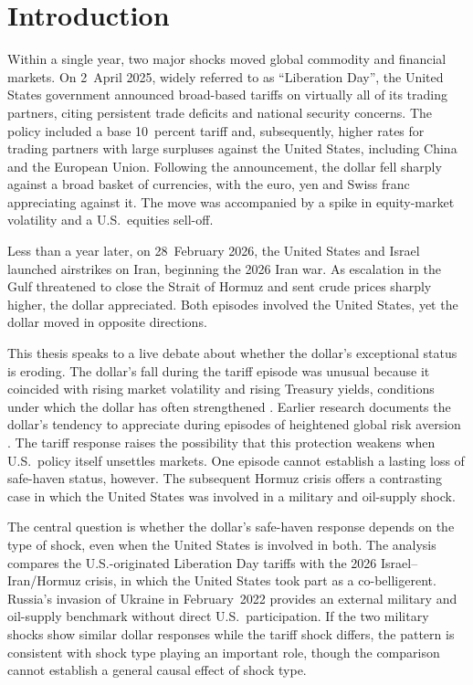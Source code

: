 
\chapter{Introduction}
\label{ch:introduction}

Within a single year, two major shocks moved global commodity and financial markets. On 2~April 2025, widely referred to as ``Liberation Day'', the United States government announced broad-based tariffs on virtually all of its trading partners, citing persistent trade deficits and national security concerns. The policy included a base 10~percent tariff and, subsequently, higher rates for trading partners with large surpluses against the United States, including China and the European Union. Following the announcement, the dollar fell sharply against a broad basket of currencies, with the euro, yen and Swiss franc appreciating against it. The move was accompanied by a spike in equity-market volatility and a U.S.\ equities sell-off.

Less than a year later, on 28~February 2026, the United States and Israel launched airstrikes on Iran, beginning the 2026 Iran war. As escalation in the Gulf threatened to close the Strait of Hormuz and sent crude prices sharply higher, the dollar appreciated. Both episodes involved the United States, yet the dollar moved in opposite directions.

This thesis speaks to a live debate about whether the dollar's exceptional status is eroding. The dollar's fall during the tariff episode was unusual because it coincided with rising market volatility and rising Treasury yields, conditions under which the dollar has often strengthened \parencite{kamin_2025,jiang_krishnamurthy_lustig_richmond_2026}. Earlier research documents the dollar's tendency to appreciate during episodes of heightened global risk aversion \parencite{habib_stracca_2012,debock_decarvalhofilho_2015}. The tariff response raises the possibility that this protection weakens when U.S.\ policy itself unsettles markets. One episode cannot establish a lasting loss of safe-haven status, however. The subsequent Hormuz crisis offers a contrasting case in which the United States was involved in a military and oil-supply shock.

The central question is whether the dollar's safe-haven response depends on the type of shock, even when the United States is involved in both. The analysis compares the U.S.-originated Liberation Day tariffs with the 2026 Israel--Iran/Hormuz crisis, in which the United States took part as a co-belligerent. Russia's invasion of Ukraine in February~2022 provides an external military and oil-supply benchmark without direct U.S.\ participation. If the two military shocks show similar dollar responses while the tariff shock differs, the pattern is consistent with shock type playing an important role, though the comparison cannot establish a general causal effect of shock type.
\newpage

